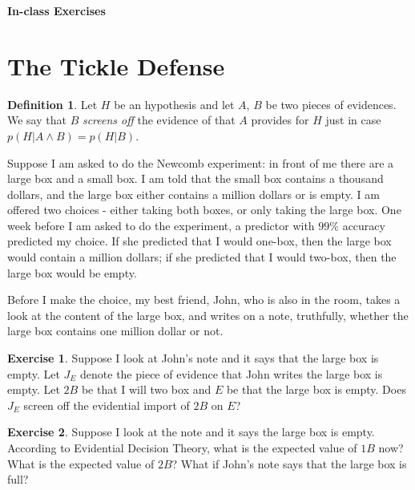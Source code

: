 \documentclass[11pt]{article}
\theoremstyle{definition}
\newtheorem{defn}{Definition}
\newtheorem{exer}{Exercise}
\begin{document}




\begin{center}
{\LARGE \bf In-class Exercises}
\end{center}

\smallskip

\section{The Tickle Defense}

\begin{defn}
Let $H$ be an hypothesis and let $A$, $B$ be two pieces of evidences. We say that $B$ \textit{screens off} the evidence of that $A$ provides for $H$ just in case $p(H | A \land B) = p(H | B)$.
\end{defn}


Suppose I am asked to do the Newcomb experiment: in front of me there are a large box and a small box. I am told that the small box contains a thousand dollars, and the large box either contains a million dollars or is empty. I am offered two choices - either taking both boxes, or only taking the large box. One week before I am asked to do the experiment, a predictor with $99\%$ accuracy predicted my choice. If she predicted that I would one-box, then the large box would contain a million dollars; if she predicted that I would two-box, then the large box would be empty.

Before I make the choice, my best friend, John, who is also in the room, takes a look at the content of the large box, and writes on a note, truthfully, whether the large box contains one million dollar or not.

\begin{exer}
Suppose I look at John's note and it says that the large box is empty. Let $J_E$ denote the piece of evidence that John writes the large box is empty. 
Let $2B$ be that I will two box and $E$ be that the large box is empty.
Does $J_E$ screen off the evidential import of $2B$ on $E$?
\end{exer}

\begin{exer}
Suppose I look at the note and it says the large box is empty. According to Evidential Decision Theory, what is the expected value of $1B$ now? What is the expected value of $2B$?  What if John's note says that the large box is full?
\end{exer}
\end{document}
